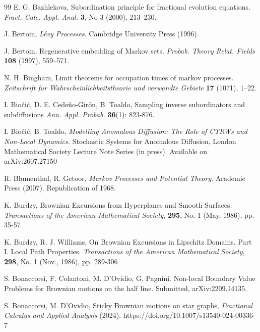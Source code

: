 \documentclass[11pt,a4paper]{article}
\newcommand{\magenta}{black}
\begin{document}
\begin{thebibliography}{99}
E. G. Bazhlekova,
Subordination principle for fractional evolution equations.
\textit{Fract. Calc. Appl. Anal.} \textbf{3}, No 3 (2000),  213--230.

%
%
%
J. Bertoin,
\textit{L\'{e}vy Processes}.
Cambridge University Press (1996). 


J. Bertoin, 
Regenerative embedding of Markov sets. 
\textit{Probab. Theory Relat. Fields} {\bf 108} (1997), 559--571.


N. H. Bingham, 
Limit theorems for occupation times of markov processes. 
\textit{Zeitschrift fur Wahrscheinlichkeitstheorie und verwandte Gebiete} {\bf 17}  (1071), 1--22.


{\color{\magenta}
I. Bio\v{c}i\'{c}, D. E. Cede\~{n}o-Gir\'{o}n, B. Toaldo,
Sampling inverse subordinators and subdiffusions
\textit{Ann. Appl. Probab.} {\bf 36}(1): 823-876.

I. Bio\v{c}i\'{c}, B. Toaldo, 
\textit{Modelling Anomalous Diffusion: The Role of CTRWs and Non-Local Dynamics.}
Stochastic Systems for Anomalous Diffusion, London Mathematical Society Lecture Note Series (in press). Available on arXiv:2607.27150
}


R. Blumenthal, R. Getoor, 
\textit{Markov Processes and Potential Theory}. Academic Press (2007). Republication of 1968.

{\color{\magenta}
K. Burdzy,
Brownian Excursions from Hyperplanes and Smooth Surfaces.
\textit{Transactions of the American Mathematical Society}, {\bf 295}, No. 1 (May, 1986), pp. 35-57

K. Burdzy, R. J. Williams,
On Brownian Excursions in Lipschitz Domains. Part I. Local Path Properties.
\textit{Transactions of the American Mathematical Society}, {\bf 298}, No. 1 (Nov., 1986), pp. 289-306
}

S. Bonaccorsi, F. Colantoni, M. D'Ovidio, G. Pagnini.
Non-local Boundary Value Problems for Brownian motions on the half line.
Submitted, 	arXiv:2209.14135.


S. Bonaccorsi, M. D'Ovidio,
Sticky Brownian motions on star graphs,
\emph{Fractional Calculus and Applied Analysis} 
(2024). https://doi.org/10.1007/s13540-024-00336-7



\end{thebibliography}
\end{document}
